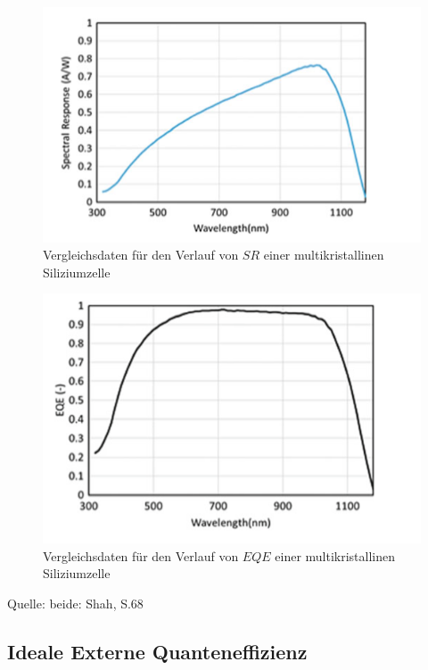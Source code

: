 \begin{figure}[ht]
    \centering
    \includegraphics[scale=0.75]{Bilder/TheorieSR.png}
    \caption{Vergleichsdaten für den Verlauf von $SR$ einer multikristallinen Siliziumzelle}
    \label{bild:ThSR}
\end{figure}

\begin{figure}[ht]
    \centering
    \includegraphics[scale=0.75]{Bilder/TheorieEQE.png}
    \caption{Vergleichsdaten für den Verlauf von $EQE$ einer multikristallinen Siliziumzelle}
    \label{bild:ThEQE}
\end{figure}

Quelle: beide: Shah, S.68


\clearpage
\subsection{Ideale Externe Quanteneffizienz}

